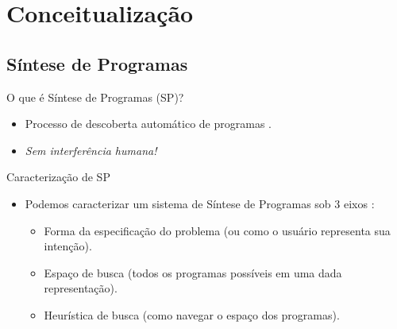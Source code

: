 
\section{Conceitualização}

\subsection{Síntese de Programas}
\begin{frame}{O que é Síntese de Programas (SP)?}
    \begin{itemize}
      \item Processo de descoberta automático de programas \cite{gulwani2017}.
      \item \textit{Sem interferência humana!}
    \end{itemize}
\end{frame}

\begin{frame}{Caracterização de SP}
    \begin{itemize}
        \item Podemos caracterizar um sistema de Síntese de Programas sob 3 eixos \cite{gulwani2010}:
        \begin{itemize}
            \item Forma da especificação do problema (ou como o usuário representa sua intenção).
            \item Espaço de busca (todos os programas possíveis em uma dada representação).
            \item Heurística de busca (como navegar o espaço dos programas).
        \end{itemize}
    \end{itemize}
\end{frame}

